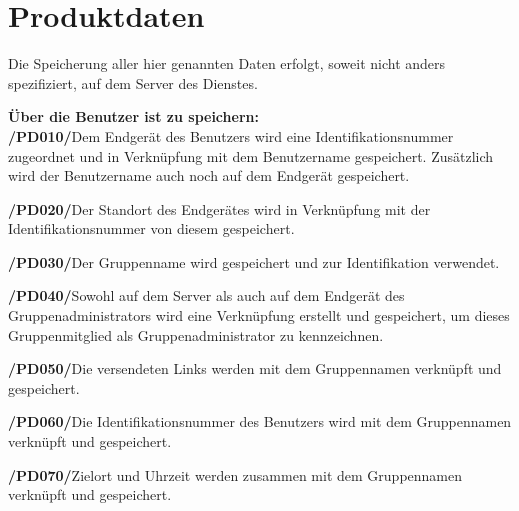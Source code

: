 \section{Produktdaten}

Die Speicherung aller hier genannten Daten erfolgt, soweit nicht anders spezifiziert, auf dem Server des Dienstes.

\textbf{Über die Benutzer ist zu speichern:}\\

\textbf{/PD010/}Dem Endgerät des Benutzers wird eine Identifikationsnummer zugeordnet und in Verknüpfung mit dem Benutzername gespeichert. Zusätzlich wird der
 Benutzername auch noch auf dem Endgerät gespeichert.

\textbf{/PD020/}Der Standort des Endgerätes wird in Verknüpfung mit der Identifikationsnummer von diesem gespeichert.

\textbf{/PD030/}Der Gruppenname wird gespeichert und zur Identifikation verwendet.

\textbf{/PD040/}Sowohl auf dem Server als auch auf dem Endgerät des Gruppenadministrators wird eine Verknüpfung erstellt und gespeichert, um dieses Gruppenmitglied als Gruppenadministrator zu kennzeichnen.

\textbf{/PD050/}Die versendeten Links werden mit dem Gruppennamen verknüpft und gespeichert. 

\textbf{/PD060/}Die Identifikationsnummer des Benutzers wird mit dem Gruppennamen verknüpft und gespeichert.

\textbf{/PD070/}Zielort und Uhrzeit werden zusammen mit dem Gruppennamen verknüpft und gespeichert.